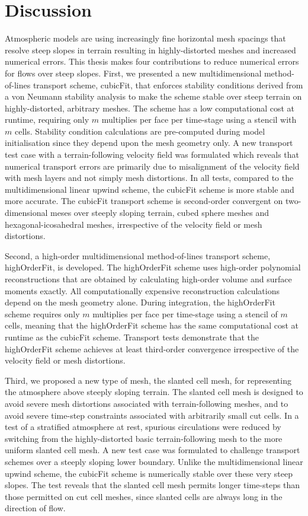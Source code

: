 \chapter{Discussion}
\label{ch:discussion}

Atmospheric models are using increasingly fine horizontal mesh spacings that resolve steep slopes in terrain resulting in highly-distorted meshes and increased numerical errors.
This thesis makes four contributions to reduce numerical errors for flows over steep slopes.
First, we presented a new multidimensional method-of-lines transport scheme, cubicFit, that enforces stability conditions derived from a von Neumann stability analysis to make the scheme stable over steep terrain on highly-distorted, arbitrary meshes.
The scheme has a low computational cost at runtime, requiring only $m$ multiplies per face per time-stage using a stencil with $m$ cells.
Stability condition calculations are pre-computed during model initialisation since they depend upon the mesh geometry only.
A new transport test case with a terrain-following velocity field was formulated which reveals that numerical transport errors are primarily due to misalignment of the velocity field with mesh layers and not simply mesh distortions.
In all tests, compared to the multidimensional linear upwind scheme, the cubicFit scheme is more stable and more accurate.
The cubicFit transport scheme is second-order convergent on two-dimensional meses over steeply sloping terrain, cubed sphere meshes and hexagonal-icosahedral meshes, irrespective of the velocity field or mesh distortions.

Second, a high-order multidimensional method-of-lines transport scheme, highOrderFit, is developed.
The highOrderFit scheme uses high-order \kexact{} polynomial reconstructions that are obtained by calculating high-order volume and surface moments exactly.
All computationally expensive reconstruction calculations depend on the mesh geometry alone.
During integration, the highOrderFit scheme requires only $m$ multiplies per face per time-stage using a stencil of $m$ cells, meaning that the highOrderFit scheme has the same computational cost at runtime as the cubicFit scheme.
Transport tests demonstrate that the highOrderFit scheme achieves at least third-order convergence irrespective of the velocity field or mesh distortions.

Third, we proposed a new type of mesh, the slanted cell mesh, for representing the atmosphere above steeply sloping terrain.
The slanted cell mesh is designed to avoid severe mesh distortions associated with terrain-following meshes, and to avoid severe time-step constraints associated with arbitrarily small cut cells.
In a test of a stratified atmosphere at rest, spurious circulations were reduced by switching from the highly-distorted basic terrain-following mesh to the more uniform slanted cell mesh.
A new test case was formulated to challenge transport schemes over a steeply sloping lower boundary.
Unlike the multidimensional linear upwind scheme, the cubicFit scheme is numerically stable over these very steep slopes.
The test reveals that the slanted cell mesh permits longer time-steps than those permitted on cut cell meshes, since slanted cells are always long in the direction of flow.

